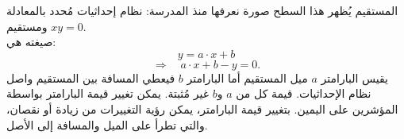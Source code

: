 \begin{surferPage}[Line]{المستقيم}
يُظهر هذا السطح صورة نعرفها منذ المدرسة: نظام إحداثيات مُحدد بالمعادلة $xy=0$ ومستقيم.\\ صيغته هي: 
\[y=a\cdot x + b\]
\[ \Rightarrow \quad a\cdot x +b -y=0.\]
يقيس البارامتر $a$ ميل المستقيم أما البارامتر $b$ فيعطي المسافة بين المستقيم واصل نظام الإحداثيات.
\newline \newline
 قيمة كل من $a$ و$b$ غير مُثبتة. يمكن تغيير قيمة البارامتر بواسطة المؤشرين على اليمين. بتغيير قيمة البارامتر، يمكن رؤية التغييرات من زيادة أو نقصان، والتي تطرأ على الميل والمسافة إلى الأصل.
\end{surferPage}
